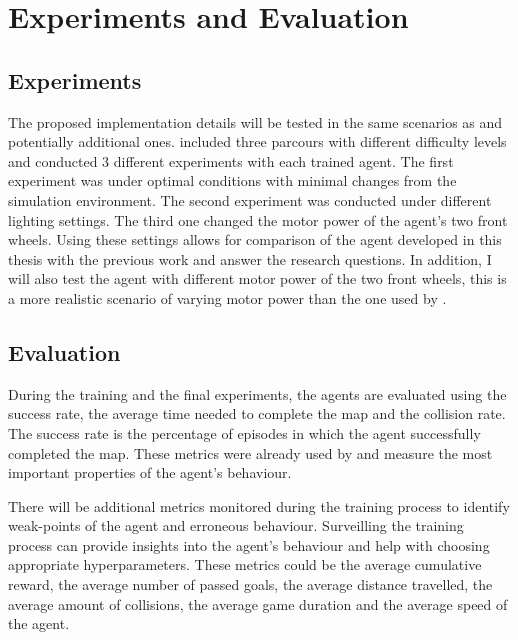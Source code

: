 \chapter{Experiments and Evaluation}
\label{cha:Experiments and Evaluation}

\section{Experiments}

The proposed implementation details will be tested in the same scenarios as \autocite{maximilian} and potentially additional ones. \autocite{maximilian} included three parcours with different difficulty levels and conducted 3 different experiments with each trained agent. The first experiment was under optimal conditions with minimal changes from the simulation environment. The second experiment was conducted under different lighting settings. The third one changed the motor power of the agent's two front wheels. Using these settings allows for comparison of the agent developed in this thesis with the previous work and answer the research questions.
In addition, I will also test the agent with different motor power of the two front wheels, this is a more realistic scenario of varying motor power than the one used by \autocite{maximilian}.

\section{Evaluation}

During the training and the final experiments, the agents are evaluated using the success rate, the average time needed to complete the map and the collision rate. The success rate is the percentage of episodes in which the agent successfully completed the map. These metrics were already used by \autocite{maximilian} and measure the most important properties of the agent's behaviour.

There will be additional metrics monitored during the training process to identify weak-points of the agent and erroneous behaviour. Surveilling the training process can provide insights into the agent's behaviour and help with choosing appropriate hyperparameters.
These metrics could be the average cumulative reward, the average number of passed goals, the average distance travelled, the average amount of collisions, the average game duration and the average speed of the agent.



